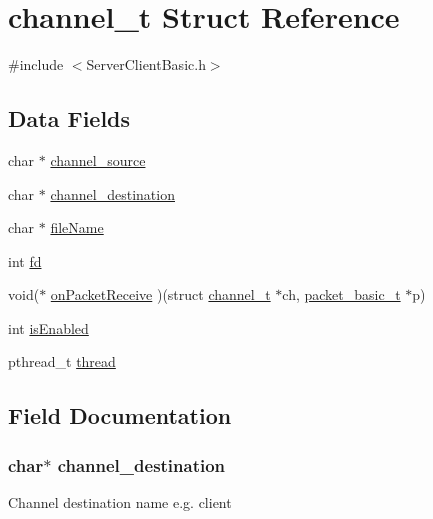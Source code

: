 \hypertarget{structchannel__t}{}\section{channel\+\_\+t Struct Reference}
\label{structchannel__t}


{\ttfamily \#include $<$Server\+Client\+Basic.\+h$>$}

\subsection*{Data Fields}
\begin{DoxyCompactItemize}
\item 
char $\ast$ \hyperlink{structchannel__t_a0a72aa1c901810c34da12df46f40041e}{channel\+\_\+source}
\item 
char $\ast$ \hyperlink{structchannel__t_a459138b7f05f5d080fa284cea148e1ea}{channel\+\_\+destination}
\item 
char $\ast$ \hyperlink{structchannel__t_a25c8761bc1f523fe6a53db546ae83add}{file\+Name}
\item 
int \hyperlink{structchannel__t_a6f8059414f0228f0256115e024eeed4b}{fd}
\item 
void($\ast$ \hyperlink{structchannel__t_ae391524520adf65e91f52efaffb033a5}{on\+Packet\+Receive} )(struct \hyperlink{structchannel__t}{channel\+\_\+t} $\ast$ch, \hyperlink{structpacket__basic__t}{packet\+\_\+basic\+\_\+t} $\ast$p)
\item 
int \hyperlink{structchannel__t_a5c56d01677044a9e8009acf457aa1a37}{is\+Enabled}
\item 
pthread\+\_\+t \hyperlink{structchannel__t_a01f75a9ad916f63a94e06a27635ba278}{thread}
\end{DoxyCompactItemize}


\subsection{Field Documentation}
\subsubsection[{\texorpdfstring{channel\+\_\+destination}{channel_destination}}]{\setlength{\rightskip}{0pt plus 5cm}char$\ast$ channel\+\_\+destination}\hypertarget{structchannel__t_a459138b7f05f5d080fa284cea148e1ea}{}\label{structchannel__t_a459138b7f05f5d080fa284cea148e1ea}
Channel destination name e.\+g. client 

